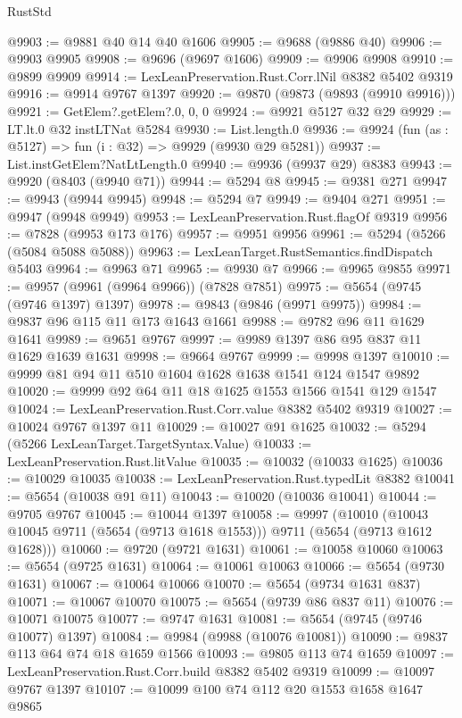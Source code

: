 \begin{lexlean}{RustStd}
\begin{coremodule}
@9903 := @9881 @40 @14 @40 @1606
@9905 := @9688 (@9886 @40)
@9906 := @9903 @9905
@9908 := @9696 (@9697 @1606)
@9909 := @9906 @9908
@9910 := @9899 @9909
@9914 := LexLeanPreservation.Rust.Corr.lNil @8382 @5402 @9319
@9916 := @9914 @9767 @1397
@9920 := @9870 (@9873 (@9893 (@9910 @9916)))
@9921 := GetElem?.getElem?.{0, 0, 0}
@9924 := @9921 @5127 @32 @29
@9929 := LT.lt.{0} @32 instLTNat @5284
@9930 := List.length.{0}
@9936 := @9924 (fun (as : @5127) => fun (i : @32) => @9929 (@9930 @29 @5281))
@9937 := List.instGetElem?NatLtLength.{0}
@9940 := @9936 (@9937 @29) @8383
@9943 := @9920 (@8403 (@9940 @71))
@9944 := @5294 @8
@9945 := @9381 @271
@9947 := @9943 (@9944 @9945)
@9948 := @5294 @7
@9949 := @9404 @271
@9951 := @9947 (@9948 @9949)
@9953 := LexLeanPreservation.Rust.flagOf @9319
@9956 := @7828 (@9953 @173 @176)
@9957 := @9951 @9956
@9961 := @5294 (@5266 (@5084 @5088 @5088))
@9963 := LexLeanTarget.RustSemantics.findDispatch @5403
@9964 := @9963 @71
@9965 := @9930 @7
@9966 := @9965 @9855
@9971 := @9957 (@9961 (@9964 @9966)) (@7828 @7851)
@9975 := @5654 (@9745 (@9746 @1397) @1397)
@9978 := @9843 (@9846 (@9971 @9975))
@9984 := @9837 @96 @115 @11 @173 @1643 @1661
@9988 := @9782 @96 @11 @1629 @1641
@9989 := @9651 @9767
@9997 := @9989 @1397 @86 @95 @837 @11 @1629 @1639 @1631
@9998 := @9664 @9767
@9999 := @9998 @1397
@10010 := @9999 @81 @94 @11 @510 @1604 @1628 @1638 @1541 @124 @1547 @9892
@10020 := @9999 @92 @64 @11 @18 @1625 @1553 @1566 @1541 @129 @1547
@10024 := LexLeanPreservation.Rust.Corr.value @8382 @5402 @9319
@10027 := @10024 @9767 @1397 @11
@10029 := @10027 @91 @1625
@10032 := @5294 (@5266 LexLeanTarget.TargetSyntax.Value)
@10033 := LexLeanPreservation.Rust.litValue
@10035 := @10032 (@10033 @1625)
@10036 := @10029 @10035
@10038 := LexLeanPreservation.Rust.typedLit @8382
@10041 := @5654 (@10038 @91 @11)
@10043 := @10020 (@10036 @10041)
@10044 := @9705 @9767
@10045 := @10044 @1397
@10058 := @9997
    (@10010 (@10043 @10045 @9711 (@5654 (@9713 @1618 @1553))) @9711 (@5654 (@9713 @1612 @1628)))
@10060 := @9720 (@9721 @1631)
@10061 := @10058 @10060
@10063 := @5654 (@9725 @1631)
@10064 := @10061 @10063
@10066 := @5654 (@9730 @1631)
@10067 := @10064 @10066
@10070 := @5654 (@9734 @1631 @837)
@10071 := @10067 @10070
@10075 := @5654 (@9739 @86 @837 @11)
@10076 := @10071 @10075
@10077 := @9747 @1631
@10081 := @5654 (@9745 (@9746 @10077) @1397)
@10084 := @9984 (@9988 (@10076 @10081))
@10090 := @9837 @113 @64 @74 @18 @1659 @1566
@10093 := @9805 @113 @74 @1659
@10097 := LexLeanPreservation.Rust.Corr.build @8382 @5402 @9319
@10099 := @10097 @9767 @1397
@10107 := @10099 @100 @74 @112 @20 @1553 @1658 @1647 @9865

\end{coremodule}
\end{lexlean}
